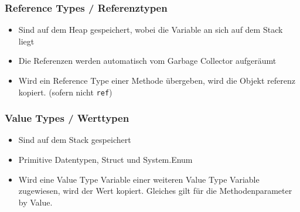 \documentclass[
a4paper,
oneside,
10pt,
fleqn,
headsepline,
toc=listofnumbered, 
bibliography=totocnumbered]{scrartcl}
\begin{document}
\clearpage

\subsubsection{Reference Types / Referenztypen}
\begin{itemize}
	\item Sind auf dem Heap gespeichert, wobei die Variable an sich auf dem Stack liegt
	\item Die Referenzen werden automatisch vom Garbage Collector aufgeräumt
	\item Wird ein Reference Type einer Methode übergeben, wird die Objekt referenz kopiert. (sofern nicht \lstinline|ref|)
\end{itemize}

\subsubsection{Value Types / Werttypen}
\begin{itemize}
	\item Sind auf dem Stack gespeichert
	\item Primitive Datentypen, Struct und System.Enum
	\item Wird eine Value Type Variable einer weiteren Value Type Variable zugewiesen, wird der Wert kopiert. Gleiches gilt für die Methodenparameter by Value.
\end{itemize}
\end{document}
